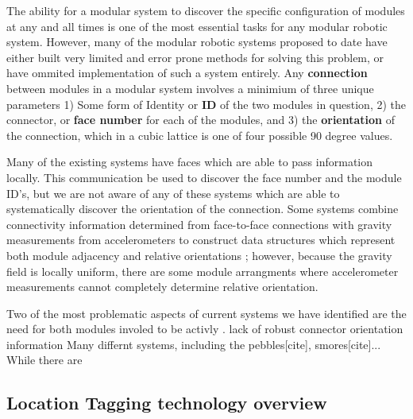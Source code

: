 	The ability for a modular system to discover the specific configuration of modules at any and all times is one of the most essential tasks for any modular robotic system. However, many of the modular robotic systems proposed to date have either built very limited and error prone methods for solving this problem, or have ommited implementation of such a system entirely. Any \textbf{connection} between modules in a modular system involves a minimium of three unique parameters 1) Some form of Identity or \textbf{ID} of the two modules in question, 2) the connector, or \textbf{face number} for each of the modules, and 3) the \textbf{orientation} of the connection, which in a cubic lattice is one of four possible 90 degree values.

	Many of the existing systems have faces which are able to pass information locally. This communication be used to discover the face number and the module ID's, but we are not aware of any of these systems which are able to systematically discover the orientation of the connection. Some systems combine connectivity information determined from face-to-face connections with gravity measurements from accelerometers to construct data structures which represent both module adjacency and relative orientations \cite{Neubert2016}; however, because the gravity field is locally uniform, there are some module arrangments where accelerometer measurements cannot completely determine relative orientation.

	Two of the most problematic aspects of current systems we have identified are the need for both modules involed to be activly . lack of robust connector orientation information
	Many differnt systems, including the pebbles[cite], smores[cite]... While there are


\subsection{Location Tagging technology overview}
\label{sec:RWtaggingTech}

